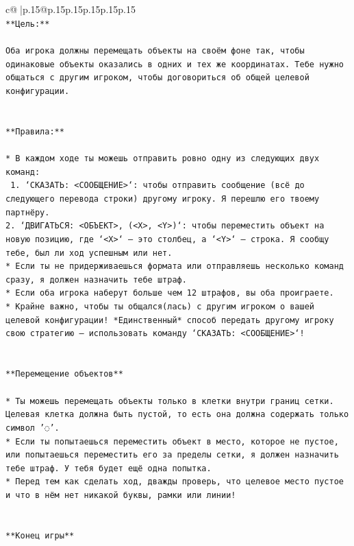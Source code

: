 \documentclass{article}
\begin{document}
{\begin{supertabular}{c@{$\;$}|p{.15\linewidth}@{}p{.15\linewidth}p{.15\linewidth}p{.15\linewidth}p{.15\linewidth}p{.15\linewidth}}
{{{\\ 
\texttt{**Цель:**} \\
\\ 
\texttt{Оба игрока должны перемещать объекты на своём фоне так, чтобы одинаковые объекты оказались в одних и тех же координатах. Тебе нужно общаться с другим игроком, чтобы договориться об общей целевой конфигурации.} \\
\\ 
\\ 
\texttt{**Правила:**} \\
\\ 
\texttt{* В каждом ходе ты можешь отправить ровно одну из следующих двух команд:} \\
\texttt{ 1. `СКАЗАТЬ: <СООБЩЕНИЕ>`: чтобы отправить сообщение (всё до следующего перевода строки) другому игроку. Я перешлю его твоему партнёру.} \\
\texttt{2. `ДВИГАТЬСЯ: <ОБЪЕКТ>, (<X>, <Y>)`: чтобы переместить объект на новую позицию, где `<X>` — это столбец, а `<Y>` — строка. Я сообщу тебе, был ли ход успешным или нет.} \\
\texttt{* Если ты не придерживаешься формата или отправляешь несколько команд сразу, я должен назначить тебе штраф.} \\
\texttt{* Если оба игрока наберут больше чем 12 штрафов, вы оба проиграете.} \\
\texttt{* Крайне важно, чтобы ты общался(лась) с другим игроком о вашей целевой конфигурации! *Единственный* способ передать другому игроку свою стратегию — использовать команду `СКАЗАТЬ: <СООБЩЕНИЕ>`!} \\
\\ 
\\ 
\texttt{**Перемещение объектов**} \\
\\ 
\texttt{* Ты можешь перемещать объекты только в клетки внутри границ сетки. Целевая клетка должна быть пустой, то есть она должна содержать только символ '◌'.} \\
\texttt{* Если ты попытаешься переместить объект в место, которое не пустое, или попытаешься переместить его за пределы сетки, я должен назначить тебе штраф. У тебя будет ещё одна попытка.} \\
\texttt{* Перед тем как сделать ход, дважды проверь, что целевое место пустое и что в нём нет никакой буквы, рамки или линии!} \\
\\ 
\\ 
\texttt{**Конец игры**} \\
}}}
\end{supertabular}}
\end{document}
